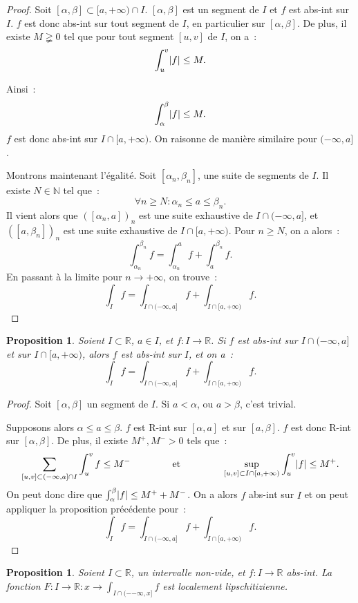 \documentclass{report}
\newtheorem{prp}[thm]{Proposition}
\theoremstyle{definition}
\theoremstyle{remark}
\newcommand{\R}{\mathbb R}
\newcommand{\N}{\mathbb N}
\newcommand{\minfty}{{-\infty}}
\newcommand{\pinfty}{{+\infty}}
\begin{document}
			\begin{proof} Soit $[\alpha, \beta] \subset [a, \pinfty) \cap I$. $[\alpha, \beta]$ est un segment de $I$ et $f$ est abs-int sur $I$. $f$ est donc abs-int
			sur tout segment de $I$, en particulier sur $[\alpha, \beta]$. De plus, il existe $M \gneqq 0$ tel que pour tout segment $[u, v]$ de $I$, on a~:
			\[\int_u^v \abs f \leq M.\]

			Ainsi~:
			\[\int_\alpha^\beta \abs f \leq M.\]
			$f$ est donc abs-int sur $I \cap [a, \pinfty)$. On raisonne de manière similaire pour $(\minfty, a]$.

			Montrons maintenant l'égalité. Soit $[\alpha_n, \beta_n]$, une suite de segments de $I$. Il existe $N \in \N$ tel que~:
			\[\forall n \geq N : \alpha_n \leq a \leq \beta_n.\]
			Il vient alors que $([\alpha_n, a])_n$ est une suite exhaustive de $I \cap (\minfty, a]$, et $([a, \beta_n])_n$ est une suite exhaustive de
			$I \cap [a, \pinfty)$. Pour $n \geq N$, on a alors~:
			\[\int_{\alpha_n}^{\beta_n} f = \int_{\alpha_n}^a f + \int_a^{\beta_n} f.\]
			En passant à la limite pour $n \to \pinfty$, on trouve~:
			\[\int_I f= \int_{I \cap (\minfty, a]} f + \int_{I \cap [a, \pinfty)} f.\]
			\end{proof}

			\begin{prp} Soient $I \subset \R$, $a \in I$, et $f : I \to \R$. Si $f$ est abs-int sur $I \cap (\minfty, a]$ et sur $I \cap [a, \pinfty)$, alors $f$
			est abs-int sur $I$, et on a~:
			\[\int_I f = \int_{I \cap (\minfty, a]} f + \int_{I \cap [a, \pinfty)} f.\]
			\end{prp}

			\begin{proof} Soit $[\alpha, \beta]$ un segment de $I$. Si $a < \alpha$, ou $a > \beta$, c'est trivial.

			Supposons alors $\alpha \leq a \leq \beta$. $f$ est R-int sur $[\alpha, a]$ et sur $[a, \beta]$. $f$ est donc R-int sur $[\alpha, \beta]$. De plus, il existe
			$M^+, M^- > 0$ tels que~:
			\[\sum_{[u, v] \subset (\minfty, a] \cap I}\int_u^v f \leq M^-\qquad\qquad\text{ et }\qquad\qquad\sup_{[u, v] \subset I \cap [a, \pinfty)}\int_u^v\abs f
				\leq M^+.\]
			On peut donc dire que $\int_\alpha^\beta\abs f \leq M^+ + M^-$. On a alors $f$ abs-int sur $I$ et on peut appliquer la proposition précédente pour~:
			\[\int_I f = \int_{I \cap (\minfty, a]} f + \int_{I \cap [a, \pinfty)} f.\]
			\end{proof}

			\begin{prp} Soient $I \subset \R$, un intervalle non-vide, et $f : I \to \R$ abs-int. La fonction $F : I \to \R : x \to \int_{I \cap (-\minfty, x]} f$ est
			localement lipschitizienne.
			\end{prp}
\end{document}

